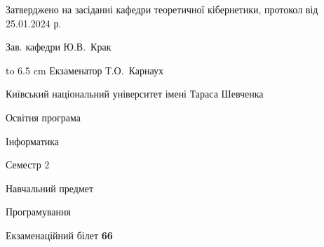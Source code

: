 \documentclass[12pt, ukrainian]{article}
\begin{document}
{\smallskip\smallskip \begin {scriptsize} Затверджено на засіданні кафедри теоретичної кібернетики, протокол   від   25.01.2024 р.\par\smallskip\smallskip\smallskip\smallskip
{\parbox {6.5 cm} {Зав. кафедри \dotfill Ю.В.~Крак}}\hspace {0.7cm} {\hbox to 6.5 cm { Екзаменатор \dotfill Т.О.~Карнаух}} \end{scriptsize}}
\newpage
{{\begin {scriptsize}\par
{ \center  Київський національний університет імені Тараса Шевченка \par}
{\parbox {5 cm}{Освітня програма \hfill}{\parbox {7 cm}{Інформатика\hfill}}\parbox {6 cm}{\hfill Семестр 2}}\par
{\parbox {5 cm} {Навчальний предмет \hfill}\parbox {7 cm}{Програмування \hfill}\parbox {6cm}{\hfill}\par}\vspace{-15pt} \end{scriptsize}}{\center Екзаменаційний білет \No \textbf { 66 }\par}}
\end{document}

